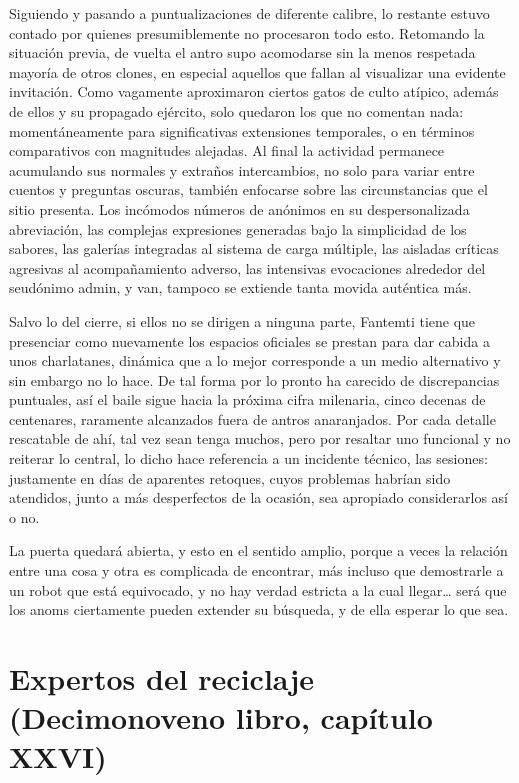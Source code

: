 \documentclass[
]{book}
\begin{document}
Siguiendo y pasando a puntualizaciones de diferente calibre, lo restante estuvo contado por quienes presumiblemente no procesaron todo esto. Retomando la situación previa, de vuelta el antro supo acomodarse sin la menos respetada mayoría de otros clones, en especial aquellos que fallan al visualizar una evidente invitación. Como vagamente aproximaron ciertos gatos de culto atípico, además de ellos y su propagado ejército, solo quedaron los que no comentan nada: momentáneamente para significativas extensiones temporales, o en términos comparativos con magnitudes alejadas. Al final la actividad permanece acumulando sus normales y extraños intercambios, no solo para variar entre cuentos y preguntas oscuras, también enfocarse sobre las circunstancias que el sitio presenta. Los incómodos números de anónimos en su despersonalizada abreviación, las complejas expresiones generadas bajo la simplicidad de los sabores, las galerías integradas al sistema de carga múltiple, las aisladas críticas agresivas al acompañamiento adverso, las intensivas evocaciones alrededor del seudónimo admin, y van, tampoco se extiende tanta movida auténtica más.

Salvo lo del cierre, si ellos no se dirigen a ninguna parte, Fantemti tiene que presenciar como nuevamente los espacios oficiales se prestan para dar cabida a unos charlatanes, dinámica que a lo mejor corresponde a un medio alternativo y sin embargo no lo hace. De tal forma por lo pronto ha carecido de discrepancias puntuales, así el baile sigue hacia la próxima cifra milenaria, cinco decenas de centenares, raramente alcanzados fuera de antros anaranjados. Por cada detalle rescatable de ahí, tal vez sean tenga muchos, pero por resaltar uno funcional y no reiterar lo central, lo dicho hace referencia a un incidente técnico, las sesiones: justamente en días de aparentes retoques, cuyos problemas habrían sido atendidos, junto a más desperfectos de la ocasión, sea apropiado considerarlos así o no.

La puerta quedará abierta, y esto en el sentido amplio, porque a veces la relación entre una cosa y otra es complicada de encontrar, más incluso que demostrarle a un robot que está equivocado, y no hay verdad estricta a la cual llegar\ldots{} será que los anoms ciertamente pueden extender su búsqueda, y de ella esperar lo que sea.

\hypertarget{expertos-del-reciclaje-decimonoveno-libro-capuxedtulo-xxvi}{%
\section{Expertos del reciclaje (Decimonoveno libro, capítulo XXVI)}\label{expertos-del-reciclaje-decimonoveno-libro-capuxedtulo-xxvi}}
\end{document}
